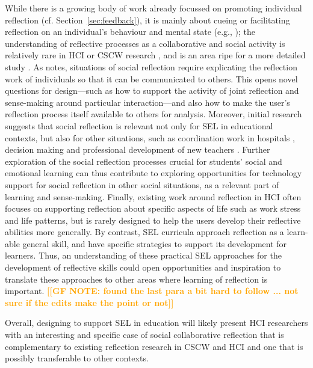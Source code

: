 \documentclass[prodmode,acmtochi]{acmsmall}
\newcommand{\Geraldine}[1]{\textrm{\textbf{\textcolor{Orange}{[[#1]]}}}}
\begin{document}
While there is a growing body of work already focussed on promoting individual reflection (cf. Section~\ref{sec:feedback}), it is mainly about cueing or facilitating reflection on an individual's behaviour and mental state (e.g., \cite{Sas2011,Stahl2008,Thieme2011,Isaacs2013}); the understanding of reflective processes as a collaborative and social activity is relatively rare in HCI or CSCW research \cite{Fleck2012,Prilla2012}, and is an area ripe for a more detailed study \cite{Baumer2014,Mentis2014}. As  notes, situations of social reflection require explicating the reflection work of individuals so that it can be communicated to others. This opens novel questions for design---such as how to support the activity of joint reflection and sense-making around particular interaction---and also how to make the user's reflection process itself available to others for analysis.
%
Moreover, initial research suggests that social reflection is relevant not only for SEL in educational contexts, but also for other situations, such as coordination work in hospitals \cite{Prilla2012}, decision making \cite{Marcu2014} and professional development of new teachers \cite{Fleck2009}.  Further exploration of the social reflection processes crucial for students' social and emotional learning can thus contribute to exploring opportunities for technology support for social reflection in other social situations, as a relevant part of learning and sense-making.
%
Finally, existing work around reflection in HCI often focuses on supporting reflection about specific aspects of life such as work stress and life patterns, but is rarely designed to help the users develop their reflective abilities more generally. By contrast, SEL curricula approach reflection as a learn-able general skill, and have specific strategies to support its development for learners. Thus, an understanding of these practical SEL approaches for the development of reflective skills  could open opportunities and inspiration to translate these approaches to other areas where learning of reflection is important. 
\Geraldine{GF NOTE: found the last para a bit hard to follow ... not sure if the edits make the point or not}

Overall, designing to support SEL in education will likely present HCI researchers with an interesting and specific case of social collaborative reflection that is complementary to  existing reflection research in CSCW and HCI and one that is possibly transferable to other contexts.   
\end{document}
